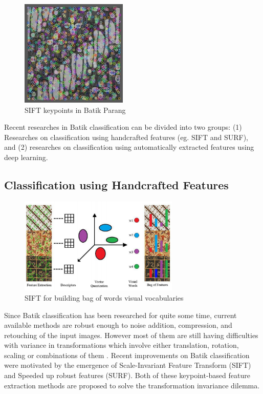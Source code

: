 \documentclass[conference]{IEEEtran}
\begin{document}
\begin{figure}[!b]
\centering
\includegraphics[width=2.0in]{batik-parang-keypoints}
\caption{SIFT keypoints in Batik Parang}
\label{fig_batik_parang_keypoints}
\end{figure}


Recent researches in Batik classification can be divided into two groups: (1) Researches on classification using handcrafted features (eg. SIFT and SURF), and (2) researches on classification using automatically extracted features using deep learning.

\subsection{Classification using Handcrafted Features}

\begin{figure}[!t]
\centering
\includegraphics[width=3.0in]{sift-bag-of-words}
\caption{SIFT for building bag of words visual vocabularies}
\label{fig_sift_bag_of_words}
\end{figure}

Since Batik classification has been researched for quite some time, current available methods are robust enough to noise addition, compression, and retouching of the input images. However most of them are still having difficulties with variance in transformations which involve either translation, rotation, scaling or combinations of them \cite{nurhaida2015automatic}. Recent improvements on Batik classification were motivated by the emergence of Scale-Invariant Feature Transform (SIFT)\cite{lowe2004distinctive} and Speeded up robust features (SURF)\cite{bay2006surf}. Both of these keypoint-based feature extraction methods are proposed to solve the transformation invariance dilemma.
\end{document}
